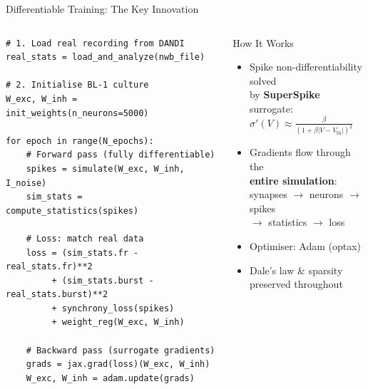 \documentclass[aspectratio=169,10pt]{beamer}
\begin{document}
\begin{frame}{Differentiable Training: The Key Innovation}
\begin{columns}[T]
\begin{lstlisting}[title={\scriptsize\bfseries Training loop (pseudocode)}]
# 1. Load real recording from DANDI
real_stats = load_and_analyze(nwb_file)

# 2. Initialise BL-1 culture
W_exc, W_inh = init_weights(n_neurons=5000)

for epoch in range(N_epochs):
    # Forward pass (fully differentiable)
    spikes = simulate(W_exc, W_inh, I_noise)
    sim_stats = compute_statistics(spikes)

    # Loss: match real data
    loss = (sim_stats.fr - real_stats.fr)**2
         + (sim_stats.burst - real_stats.burst)**2
         + synchrony_loss(spikes)
         + weight_reg(W_exc, W_inh)

    # Backward pass (surrogate gradients)
    grads = jax.grad(loss)(W_exc, W_inh)
    W_exc, W_inh = adam.update(grads)
\end{lstlisting}

\vspace{8pt}
\begin{block}{\small How It Works}
\begin{itemize}\scriptsize
  \item Spike non-differentiability solved\\by \textbf{SuperSpike} surrogate:\\
        $\sigma'(V) \approx \frac{\beta}{(1 + \beta|V-V_{\mathrm{th}}|)^2}$
  \item Gradients flow through the\\
        \textbf{entire simulation}:\\
        synapses $\to$ neurons $\to$ spikes\\
        $\to$ statistics $\to$ loss
  \item Optimiser: Adam (optax)
  \item Dale's law \& sparsity\\preserved throughout
\end{itemize}
\end{block}

\vspace{6pt}
\centering
{}
\end{columns}
\end{frame}
\end{document}
